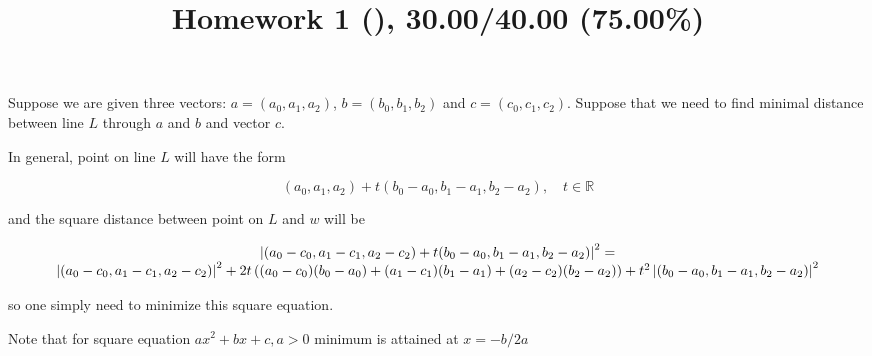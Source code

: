 \documentclass[10pt]{article} %
\title{Homework 1 (),
30.00/40.00 (75.00\%)
}
\begin{document}
Suppose we are given three vectors: $a=(a_0,a_1,a_2)$, $b=(b_0,b_1,b_2)$ and $c=(c_0,c_1,c_2)$.
Suppose that we need to find minimal distance between line $L$ through $a$ and $b$ and vector $c$.

In general, point on line $L$ will have the form

\begin{equation*}
	(a_0,a_1,a_2)+t(b_0-a_0,b_1-a_1,b_2-a_2),\quad t\in\mathbb{R}
\end{equation*}

and the square distance between point on $L$ and $w$ will be

\begin{equation*}
	\begin{array}[]{c}
	\myabs{
	(a_0-c_0,a_1-c_1,a_2-c_2)+t(b_0-a_0,b_1-a_1,b_2-a_2)
	}^2=\\
	\myabs{(a_0-c_0,a_1-c_1,a_2-c_2)}^2
	+2t\left( (a_0-c_0)(b_0-a_0)+
(a_1-c_1)(b_1-a_1)+
(a_2-c_2)(b_2-a_2)
	\right)+t^2
	\myabs{(b_0-a_0,b_1-a_1,b_2-a_2)}^2
	\end{array}
\end{equation*}

so one simply need to minimize this square equation.

Note that for square equation $ax^2+bx+c,a>0$ minimum is attained at $x=-b/2a$
\end{document}

